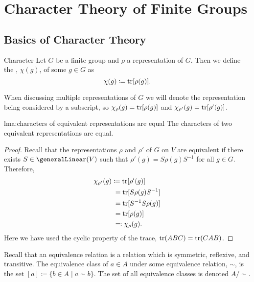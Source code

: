 \chapter{Character Theory of Finite Groups}
\section{Basics of Character Theory}
\begin{dfn}{Character}{}
    Let \(G\) be a finite group and \(\rho\) a representation of \(G\).
    Then we define the , \(\chi(g)\), of some \(g \in
    G\) as
    \begin{equation}
        \chi(g) \coloneqq \operatorname{tr}[\rho(g)].
    \end{equation}
\end{dfn}
\begin{ntn}{}{}
    When discussing multiple representations of \(G\) we will denote the
    representation being considered by a subscript, so \(\chi_\rho(g) =
    \operatorname{tr}[\rho(g)]\) and \(\chi_{\rho'}(g) = \operatorname{tr}[\rho'(g)]\).
\end{ntn}

\begin{lma}{}{lma:characters of equivalent representations are equal}
    The characters of two equivalent representations are equal.
    \begin{proof}
        Recall that the representations \(\rho\) and \(\rho'\) of \(G\) on
        \(V\) are equivalent if there exists \(S \in \generalLinear(V)\) such that
        \(\rho'(g) = S\rho(g) S^{-1}\) for all \(g \in G\).
        Therefore,
        \begin{align}
            \chi_{\rho'}(g) &\coloneqq \operatorname{tr}[\rho'(g)]\\
            &\hphantom{:}= \operatorname{tr}[S\rho(g)S^{-1}]\\
            &\hphantom{:}= \operatorname{tr}[S^{-1}S\rho(g)]\\
            &\hphantom{:}= \operatorname{tr}[\rho(g)]\\
            &\hphantom{:}\eqqcolon \chi_{\rho}(g).
        \end{align}
        Here we have used the cyclic property of the trace, \(\operatorname{tr}(ABC) =
        \operatorname{tr}(CAB)\).
    \end{proof}
\end{lma}

Recall that an equivalence relation is a relation which is symmetric,
reflexive, and transitive.
The equivalence class of \(a \in A\) under some equivalence relation,
\(\sim\), is the set \([a] \coloneqq \{b \in A \mid a \sim b\}\).
The set of all equivalence classes is denoted \(A/\sim\).

